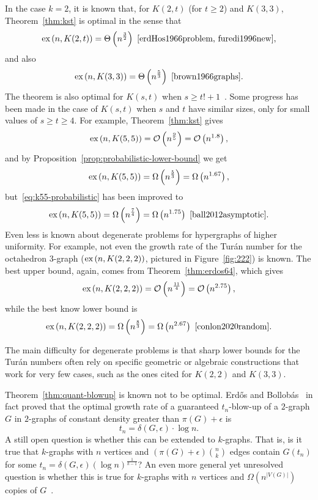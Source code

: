 In the case $k=2$, it is known that, for $K(2, t)$ (for $t \geq 2$) and $K(3, 3)$,
Theorem~\ref{thm:kst} is optimal in the sense that
\[
    \text{ex} \left( n, K(2, t) \right)
    = \Theta\left(n^{\frac{3}{2}}\right)~\cite{erdHos1966problem, furedi1996new},
\]
and also
\[
    \text{ex} \left( n, K(3, 3) \right)
    = \Theta\left(n^{\frac{5}{3}}\right)~\cite{brown1966graphs}.
\]
The theorem is also optimal for $K(s, t)$ when $s \geq t! + 1$~\cite{kollar1996norm}.
Some progress has been made in the case of $K(s, t)$ when $s$ and $t$ have similar sizes,
only for small values of $s \geq t \geq 4$.
For example, Theorem~\ref{thm:kst} gives
\[
    \text{ex} \left( n, K(5,5) \right) = \mathcal{O}\left(n^{\frac{9}{5}}\right) = \mathcal{O}\left(n^{1.8}\right),
\]
and by Proposition~\ref{prop:probabilistic-lower-bound} we get
\begin{equation} \label{eq:k55-probabilistic}
    \text{ex} \left( n, K(5,5) \right)
= \Omega\left(n^{\frac{5}{3}}\right)
= \Omega\left(n^{1.67}\right),
\end{equation}
but~\eqref{eq:k55-probabilistic} has been improved to
\[
    \text{ex} \left( n, K(5,5) \right)
    = \Omega\left(n^{\frac{7}{4}}\right)
    = \Omega\left(n^{1.75}\right)~\cite{ball2012asymptotic}.
\]
Even less is known about degenerate problems for hypergraphs of higher uniformity.
For example, not even the growth rate of the Turán number for the octahedron 3-graph
($\text{ex} \left( n, K(2, 2, 2) \right)$, pictured in Figure~\ref{fig:222}) is known.
The best upper bound, again, comes from Theorem~\ref{thm:erdos64}, which gives
\[
    \text{ex} \left( n, K(2, 2, 2) \right) = \mathcal{O}\left(n^{\frac{11}{4}}\right) = \mathcal{O}\left(n^{2.75}\right),
\]
while the best know lower bound is
\[
    \text{ex} \left( n, K(2, 2, 2) \right)
    = \Omega\left(n^{\frac{8}{3}}\right)
    = \Omega\left(n^{2.67}\right)~\cite{conlon2020random}.
\]

The main difficulty for degenerate problems is that sharp lower bounds for the Turán numbers
often rely on specific geometric or algebraic constructions that work for very few cases,
such as the ones cited for $K(2, 2)$ and $K(3, 3)$.

Theorem~\ref{thm:quant-blowup} is known not to be optimal.
Erdős and Bollobás~\cite{bollobas1973structure} in fact proved that the optimal growth
rate of a guaranteed $t_n$-blow-up of a $2$-graph $G$ in $2$-graphs of constant density greater than $\pi(G) + \epsilon$ is
\[
    t_n = \delta(G, \epsilon) \cdot \log n.
\]
A still open question is whether this can be extended to $k$-graphs.
That is, is it true that $k$-graphs with $n$ vertices and  $\left(\pi(G) + \epsilon \right)  \binom{n}{k}$ edges
contain $G(t_n)$ for some $t_n = \delta(G, \epsilon) (\log n)^{\frac{1}{k-1}}$?
An even more general yet unresolved question is whether this is true for
$k$-graphs with $n$ vertices and $\Omega (n^{|V(G)|})$ copies of $G$~\cite{rodl2012complete}.